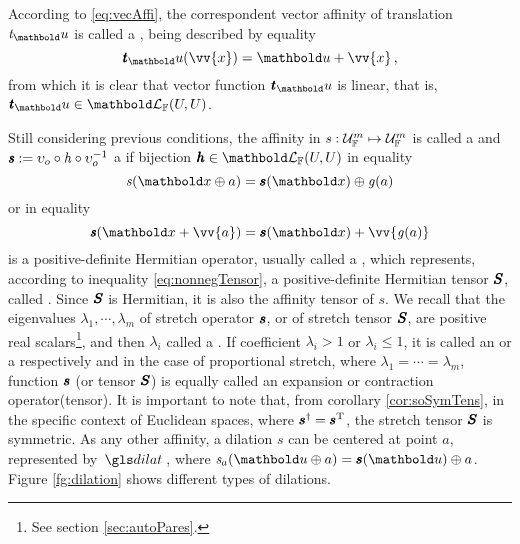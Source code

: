 According to \eqref{eq:vecAffi}, the correspondent vector affinity of translation $\mathit{t}_\vto{u}$ is called a , being described by equality
\begin{equation}\label{eq:transltVec}
\fua{\tnr{\mathit{t}}_\vto{u}}{\vv{x}}=\vto{u} + \vv{x}\,,
\end{equation}
from which it is clear that vector function $\tnr{\mathit{t}}_\vto{u}$ is linear, that is, $\tnr{\mathit{t}}_\vto{u}\in\evl{\cam{F}}{U}{U}$.

Still considering previous conditions, the affinity in $\map{\mathit{s}}{\eamd{U}{F}{m}}{\eamd{U}{F}{m}}$ is called a  and $\tnr{\mathit{s}}:= \upsilon_o\circ\mathit{h}\circ\upsilon_o^{-1}$ a  if bijection $\vtf{h}\in\evl{\cam{F}}{U}{U}$ in equality
\begin{equation}\label{eq:dilat}
\fua{\mathit{s}}{\vto{x}\oplus a}=\fua{\vtf{s}}{\vto{x}}\oplus\fua{\mathit{g}}{a}
\end{equation}
or in equality
\begin{equation}\label{eq:dilatVec}
\fua{\tnr{\mathit{s}}}{\vto{x}+ \vv{a}}=\fua{\vtf{s}}{\vto{x}}+\vv{\fua{\mathit{g}}{a}}
\end{equation}
is a positive-definite Hermitian operator, usually called a , which represents, according to inequality \eqref{eq:nonnegTensor}, a positive-definite Hermitian tensor $\tnr{S}$, called . Since $\tnr{S}$ is Hermitian, it is also the affinity tensor of $\mathit{s}$. We recall that the eigenvalues $\lambda_1,\cdots,\lambda_m$ of stretch operator $\vtf{s}$, or of stretch tensor $\tnr{S}$, are positive real scalars\footnote{See section \ref{sec:autoPares}.}, and then $\lambda_i$ called a . If coefficient $\lambda_i>1$ or $\lambda_i\leqslant1$, it is called an  or a  respectively and in the case of proportional stretch, where $\lambda_1=\cdots=\lambda_m$, function $\vtf{s}$ (or tensor $\tnr{S}$) is equally called an expansion or contraction operator(tensor). It is important to note that, from corollary \ref{cor:soSymTens}, in the specific context of Euclidean spaces, where $\vtf{s}^\dagger=\vtf{s}^\text{T}$, the stretch tensor $\tnr{S}$ is symmetric. As any other affinity, a dilation $\mathit{s}$ can be centered at point $a$, represented by $\gloref{dilat}$, where $\fua{\mathit{s}_a}{\vto{u}\oplus a}=\fua{\vtf{s}}{\vto{u}}\oplus a$. Figure \ref{fg:dilation} shows different types of dilations.
